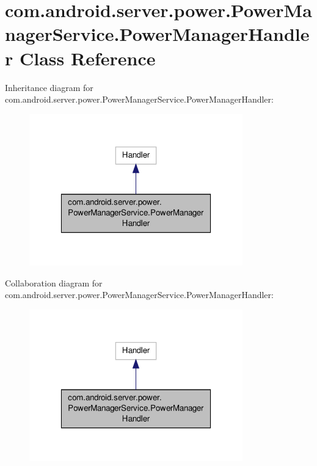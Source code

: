 \hypertarget{classcom_1_1android_1_1server_1_1power_1_1PowerManagerService_1_1PowerManagerHandler}{\section{com.\-android.\-server.\-power.\-Power\-Manager\-Service.\-Power\-Manager\-Handler Class Reference}
\label{classcom_1_1android_1_1server_1_1power_1_1PowerManagerService_1_1PowerManagerHandler}
}


Inheritance diagram for com.\-android.\-server.\-power.\-Power\-Manager\-Service.\-Power\-Manager\-Handler\-:
\nopagebreak
\begin{figure}[H]
\begin{center}
\leavevmode
\includegraphics[width=262pt]{classcom_1_1android_1_1server_1_1power_1_1PowerManagerService_1_1PowerManagerHandler__inherit__graph}
\end{center}
\end{figure}


Collaboration diagram for com.\-android.\-server.\-power.\-Power\-Manager\-Service.\-Power\-Manager\-Handler\-:
\nopagebreak
\begin{figure}[H]
\begin{center}
\leavevmode
\includegraphics[width=262pt]{classcom_1_1android_1_1server_1_1power_1_1PowerManagerService_1_1PowerManagerHandler__coll__graph}
\end{center}
\end{figure}
